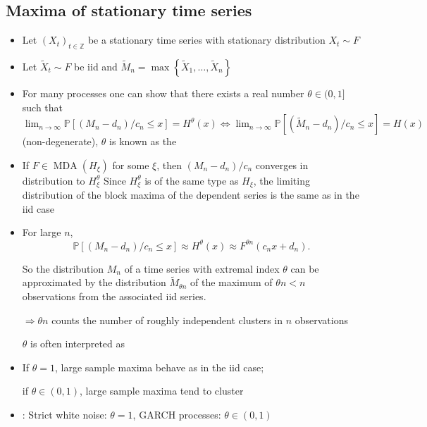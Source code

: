 \subsection*{Maxima of stationary time series}
\begin{itemize}[leftmargin=*]
    \item Let $\left(X_{t}\right)_{t \in \mathbb{Z}}$ be a stationary time series with stationary distribution $X_{t} \sim F$
    \item Let $\tilde{X}_{t} \sim F$ be iid and $\tilde{M}_{n}=\max \left\{\tilde{X}_{1}, \ldots, \tilde{X}_{n}\right\}$
    \item For many processes one can show that there exists a real number $\theta \in(0,1]$ such that $\lim _{n \rightarrow \infty} \mathbb{P}\left[\left(M_{n}-d_{n}\right) / c_{n} \leq x\right]=H^{\theta}(x) \Leftrightarrow \lim _{n \rightarrow \infty} \mathbb{P}\left[\left(\tilde{M}_{n}-d_{n}\right) / c_{n} \leq x\right]=H(x)$ (non-degenerate), $\theta$ is known as the 
    \item If $F \in \operatorname{MDA}\left(H_{\xi}\right)$ for some $\xi$, then $\left(M_{n}-d_{n}\right) / c_{n}$ converges in distribution to $H_{\xi}^{\theta}$ Since $H_{\xi}^{\theta}$ is of the same type as $H_{\xi}$, the limiting distribution of the block maxima of the dependent series is the same as in the iid case 
    \item For large $n$,
$$
\mathbb{P}\left[\left(M_{n}-d_{n}\right) / c_{n} \leq x\right] \approx H^{\theta}(x) \approx F^{\theta n}\left(c_{n} x+d_{n}\right) .
$$

So the distribution $M_{n}$ of a time series with extremal index $\theta$ can be approximated by the distribution $\tilde{M}_{\theta n}$ of the maximum of $\theta n<n$ observations from the associated iid series.

$\Rightarrow \theta n$ counts the number of roughly independent clusters in $n$ observations

$\theta$ is often interpreted as 
    \item If $\theta=1$, large sample maxima behave as in the iid case; 
    
    if $\theta \in(0,1)$, large sample maxima tend to cluster
    \item {}: Strict white noise: $\theta=1$, GARCH processes: $\theta \in(0,1)$
\end{itemize}






